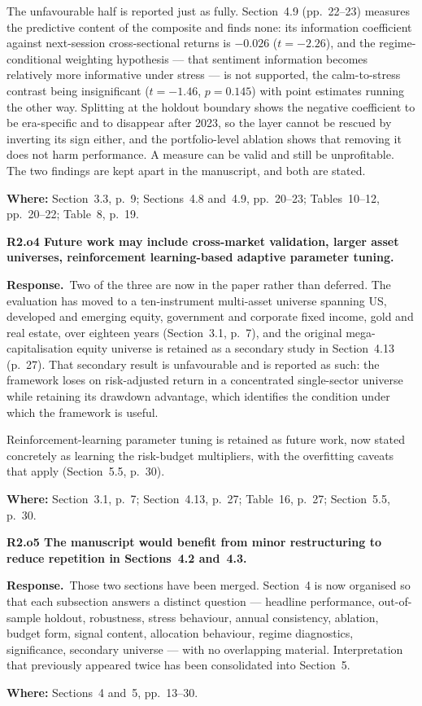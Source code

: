\documentclass[11pt,a4paper]{article}
\newcommand{\rc}[1]{\par\medskip\noindent\textbf{#1}\par\nopagebreak}
\newcommand{\resp}{\par\noindent\textbf{Response.}\ }
\newcommand{\where}[1]{\par\smallskip\noindent\textcolor{blue!55!black}{\textbf{Where:} #1}\par}
\begin{document}
The unfavourable half is reported just as fully. Section~4.9 (pp.~22--23) measures the
predictive content of the composite and finds none: its information coefficient against
next-session cross-sectional returns is $-0.026$ ($t = -2.26$), and the
regime-conditional weighting hypothesis --- that sentiment information becomes
relatively more informative under stress --- is not supported, the calm-to-stress
contrast being insignificant ($t = -1.46$, $p = 0.145$) with point estimates running the
other way. Splitting at the holdout boundary shows the negative coefficient to be
era-specific and to disappear after 2023, so the layer cannot be rescued by inverting
its sign either, and the portfolio-level ablation shows that removing it does not harm
performance. A measure can be valid and still be unprofitable. The two findings are kept
apart in the manuscript, and both are stated.
\where{Section~3.3, p.~9; Sections~4.8 and~4.9, pp.~20--23; Tables~10--12, pp.~20--22;
Table~8, p.~19.}

\rc{R2.o4 Future work may include cross-market validation, larger asset universes,
reinforcement learning-based adaptive parameter tuning.}

\resp Two of the three are now in the paper rather than deferred. The evaluation has
moved to a ten-instrument multi-asset universe spanning US, developed and emerging
equity, government and corporate fixed income, gold and real estate, over eighteen years
(Section~3.1, p.~7), and the original mega-capitalisation equity universe is retained as
a secondary study in Section~4.13 (p.~27). That secondary result is unfavourable and is
reported as such: the framework loses on risk-adjusted return in a concentrated
single-sector universe while retaining its drawdown advantage, which identifies the
condition under which the framework is useful.

Reinforcement-learning parameter tuning is retained as future work, now stated concretely
as learning the risk-budget multipliers, with the overfitting caveats that apply
(Section~5.5, p.~30).
\where{Section~3.1, p.~7; Section~4.13, p.~27; Table~16, p.~27; Section~5.5, p.~30.}

\rc{R2.o5 The manuscript would benefit from minor restructuring to reduce repetition in
Sections~4.2 and~4.3.}

\resp Those two sections have been merged. Section~4 is now organised so that each
subsection answers a distinct question --- headline performance, out-of-sample
holdout, robustness, stress
behaviour, annual consistency, ablation, budget form, signal content, allocation
behaviour, regime diagnostics, significance, secondary universe --- with no overlapping
material. Interpretation that previously appeared twice has been consolidated into
Section~5.
\where{Sections~4 and~5, pp.~13--30.}
\end{document}
